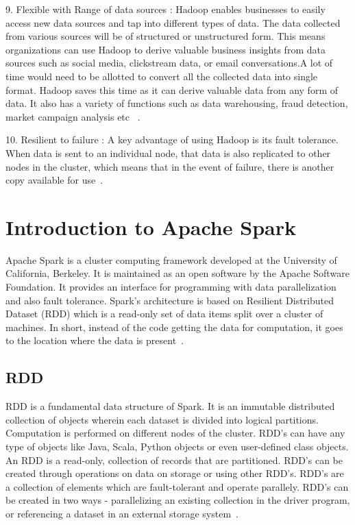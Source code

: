 9. Flexible with Range of data sources : 
Hadoop enables businesses to easily access new data sources and tap into 
different types of data. The data collected from various sources will be of 
structured or unstructured form. This means organizations can use Hadoop to 
derive valuable business insights from data sources such as social media, 
clickstream data,  or email conversations.A lot of time would need to be 
allotted to convert all the collected data into single format. Hadoop saves 
this time as it can derive valuable data from any form of data. It also has a 
variety of functions such as data warehousing, fraud detection, market campaign 
analysis etc ~\cite{hid-sp18-406-hadoop-intro12}.

10. Resilient to failure : 
A key advantage of using Hadoop is its fault tolerance. When data is sent to an 
individual node, that data is also replicated to other nodes in the cluster, 
which means that in the event of failure, there is another copy available for 
use~\cite{hid-sp18-406-hadoop-intro13}.

\section{Introduction to Apache Spark}
Apache Spark is a cluster computing framework developed 
at the University of California, Berkeley. It is maintained as an open software 
by the Apache Software Foundation. It provides an interface for programming with 
data parallelization and also fault tolerance. Spark's architecture is based on 
Resilient Distributed Dataset (RDD) which is a read-only set of data items split
over a cluster of machines. In short, instead of the code getting the data for 
computation, it goes to the location where the data is present~\cite{hid-sp18-408-Spark}. 

\subsection{RDD}
RDD is a fundamental data structure of Spark. It is an immutable distributed 
collection of objects wherein each dataset is divided into logical partitions. 
Computation is performed on different nodes of the cluster. RDD's can have any 
type of objects like Java, Scala, Python objects or even user-defined class 
objects. An RDD is a read-only, collection of records that are partitioned. 
RDD's can be created through operations on data on storage or using other RDD's.
RDD's are a collection of elements which are fault-tolerant and operate 
parallely. RDD's can be created in two ways - parallelizing an existing 
collection in the driver program, or referencing a dataset in an external 
storage system~\cite{hid-sp18-408-Spark-RDD}.

